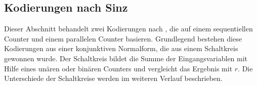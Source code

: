 \documentclass[a4,abstract=on]{scrartcl}
\begin{document}
%
%

	\subsection{Kodierungen nach Sinz}
Dieser Abschnitt behandelt zwei Kodierungen nach \citet[][]{sinz}, die auf einem sequentiellen Counter und einem parallelen Counter basieren. Grundlegend bestehen diese Kodierungen aus einer konjunktiven Normalform, die aus einem Schaltkreis gewonnen wurde. Der Schaltkreis bildet die Summe der Eingangsvariablen mit Hilfe eines unären oder binären Counters und vergleicht das Ergebnis mit $r$. Die Unterschiede der Schaltkreise werden im weiteren Verlauf beschrieben.
\end{document}
